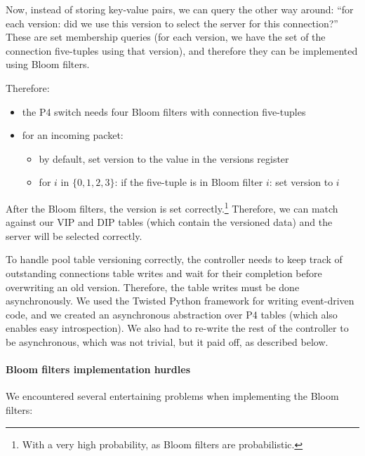 \documentclass[11pt,oneside,a4paper]{article}
\begin{document}
Now, instead of storing key-value pairs, we can query the other way around:
``for each version: did we use this version to select the server for this
connection?''
These are set membership queries (for each version, we have the set of the
connection five-tuples using that version), and therefore they can be
implemented using Bloom filters.

Therefore:

\begin{itemize}
\item the P4 switch needs four Bloom filters with connection five-tuples
\item for an incoming packet:
    \begin{itemize}
    \item by default, set version to the value in the versions register
    \item for $i$ in $\{0,1,2,3\}$: if the five-tuple is in Bloom filter $i$: set version to $i$
    \end{itemize}
\end{itemize}

After the Bloom filters, the version is set correctly.\footnote{%
With a very high probability, as Bloom filters are probabilistic.}
Therefore, we can match against our VIP and DIP tables (which contain the
versioned data) and the server will be selected correctly.

To handle pool table versioning correctly, the controller needs to keep track of
outstanding connections table writes and wait for their completion before
overwriting an old version.
Therefore, the table writes must be done asynchronously.
We used the Twisted Python framework\cite{twisted} for writing event-driven
code, and we created an asynchronous abstraction over P4 tables (which also
enables easy introspection).
We also had to re-write the rest of the controller to be asynchronous, which was
not trivial, but it paid off, as described below.

\paragraph{Bloom filters implementation hurdles}

We encountered several entertaining problems when implementing the Bloom filters:
\end{document}

